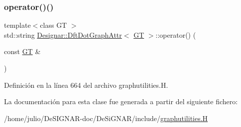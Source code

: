 \subsubsection{\texorpdfstring{operator()()}{operator()()}}
{\footnotesize\ttfamily template$<$class GT $>$ \\
std\+::string \hyperlink{class_designar_1_1_dft_dot_graph_attr}{Designar\+::\+Dft\+Dot\+Graph\+Attr}$<$ \hyperlink{demo-buildgraph_8_c_a3001c40d2c31ca87ed96cd7d1334a55e}{GT} $>$\+::operator() (\begin{DoxyParamCaption}\item[{const \hyperlink{demo-buildgraph_8_c_a3001c40d2c31ca87ed96cd7d1334a55e}{GT} \&}]{ }\end{DoxyParamCaption})\hspace{0.3cm}{\ttfamily [inline]}}



Definición en la línea 664 del archivo graphutilities.\+H.



La documentación para esta clase fue generada a partir del siguiente fichero\+:\begin{DoxyCompactItemize}
\item 
/home/julio/\+De\+S\+I\+G\+N\+A\+R-\/doc/\+De\+Si\+G\+N\+A\+R/include/\hyperlink{graphutilities_8_h}{graphutilities.\+H}\end{DoxyCompactItemize}

